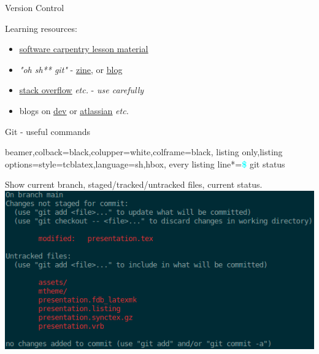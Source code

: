 \documentclass{beamer} %
\begin{document}
\begin{frame}{Version Control}
    \vspace{1cm}

    Learning resources:
    \begin{itemize}
      \item \href{http://swcarpentry.github.io/git-novice/}{\underline{software carpentry lesson material}}
      \item \textit{"oh sh** git"} - \href{https://wizardzines.com/zines/oh-shit-git/}{\underline{zine}}, or \href{https://ohshitgit.com/}{\underline{blog}}
      \item \href{https://stackoverflow.com/}{\underline{stack overflow}} \textit{etc.} - \textit{use carefully}
      \item blogs on \href{https://dev.to/}{\underline{dev}} or \href{https://www.atlassian.com/git/tutorials}{\underline{atlassian}} \textit{etc.}
    \end{itemize}

  \end{frame}

  \begin{frame}[fragile]{Git - useful commands}
    \begin{tcblisting}{beamer,colback=black,colupper=white,colframe=black,
      listing only,listing options={style=tcblatex,language=sh},hbox,
      every listing line*={\textcolor{cyan}{\small\ttfamily\bfseries\$}}}
  git status
    \end{tcblisting}
    Show current branch, staged/tracked/untracked files, current status.
    \includegraphics[height=.6\textheight]{git_status_output.png}
  \end{frame}
\end{document}

